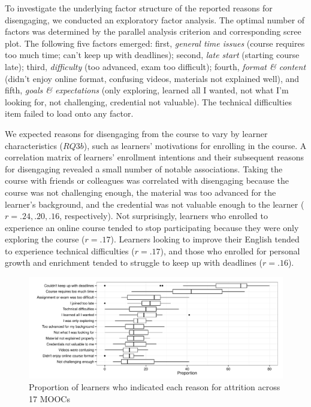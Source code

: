 \documentclass{sigchi}\usepackage[]{graphicx}\usepackage[]{color}
\makeatletter
\def\maxwidth{ %
  \ifdim\Gin@nat@width>\linewidth
    \linewidth
  \else
    \Gin@nat@width
  \fi
}
\newenvironment{knitrout}{}{} %
\makeatother
\begin{document}
To investigate the underlying factor structure of the reported reasons for disengaging, we conducted an exploratory factor analysis. The optimal number of factors was determined by the parallel analysis criterion and corresponding scree plot. The following five factors emerged: first, {\em general time issues} (course requires too much time; can't keep up with deadlines); second, {\em late start} (starting course late); third, {\em difficulty} (too advanced, exam too difficult); fourth, {\em format \& content} (didn't enjoy online format, confusing videos, materials not explained well), and fifth, {\em goals \& expectations} (only exploring, learned all I wanted, not what I'm looking for, not challenging, credential not valuable). The technical difficulties item failed to load onto any factor.

We expected reasons for disengaging from the course to vary by learner characteristics ($RQ3b$), such as learners' motivations for enrolling in the course. A correlation matrix of learners' enrollment intentions and their subsequent reasons for disengaging revealed a small number of notable associations. Taking the course with friends or colleagues was correlated with disengaging because the course was not challenging enough, the material was too advanced for the learner's background, and the credential was not valuable enough to the learner ($r=.24, .20, .16$, respectively). Not surprisingly, learners who enrolled to experience an online course tended to stop participating because they were only exploring the course ($r=.17$). Learners looking to improve their English tended to experience technical difficulties ($r=.17$), and those who enrolled for personal growth and enrichment tended to struggle to keep up with deadlines ($r=.16$).


\begin{knitrout}
\color{fgcolor}\begin{figure}[ht]

\includegraphics[width=\maxwidth]{figure/s1reason} \caption[Proportion of learners who indicated each reason for attrition across 17 MOOCs]{Proportion of learners who indicated each reason for attrition across 17 MOOCs\label{fig:s1reason}}
\end{figure}


\end{knitrout}
\end{document}
